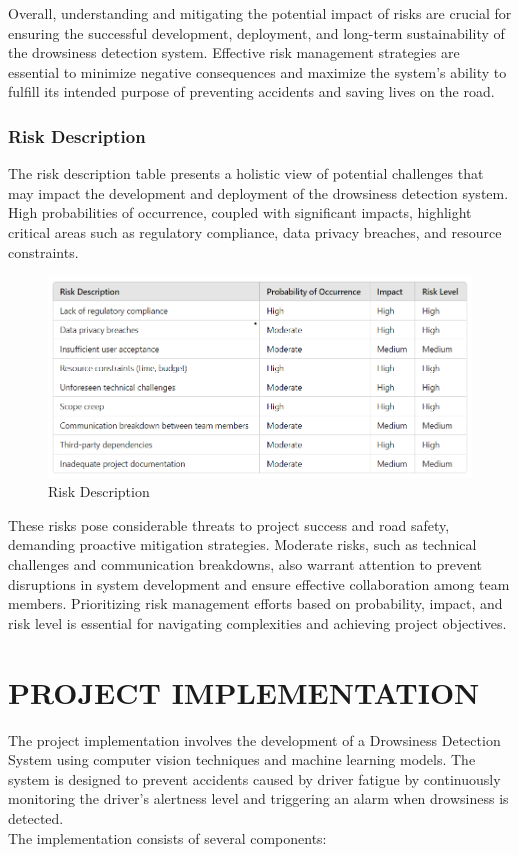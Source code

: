 \documentclass[12pt]{article}
\begin{document}
Overall, understanding and mitigating the potential impact of risks are crucial for ensuring the successful development, deployment, and long-term sustainability of the drowsiness detection system. Effective risk management strategies are essential to minimize negative consequences and maximize the system's ability to fulfill its intended purpose of preventing accidents and saving lives on the road.
\subsubsection{Risk Description}
The risk description table presents a holistic view of potential challenges that may impact the development and deployment of the drowsiness detection system. High probabilities of occurrence, coupled with significant impacts, highlight critical areas such as regulatory compliance, data privacy breaches, and resource constraints. 

\begin{figure}[h]
\centering
\includegraphics[width=1.0\textwidth]{des}
\caption{Risk Description}
\end{figure}
\FloatBarrier

These risks pose considerable threats to project success and road safety, demanding proactive mitigation strategies. Moderate risks, such as technical challenges and communication breakdowns, also warrant attention to prevent disruptions in system development and ensure effective collaboration among team members. Prioritizing risk management efforts based on probability, impact, and risk level is essential for navigating complexities and achieving project objectives.
\newpage

\section{PROJECT IMPLEMENTATION}
The project implementation involves the development of a Drowsiness Detection System using computer vision techniques and machine learning models. The system is designed to prevent accidents caused by driver fatigue by continuously monitoring the driver's alertness level and triggering an alarm when drowsiness is detected.\\
The implementation consists of several components:\\
\end{document}
